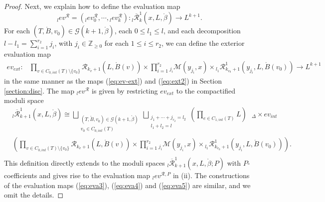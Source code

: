 \documentclass[a4paper]{article}
\numberwithin{equation}{section}
\begin{document}
\begin{proof}
Next, we explain how to define the evaluation map
\begin{equation}
{}_l\mathit{ev}^\mathcal{R}=({}_l\mathit{ev}^\mathcal{R}_0,\cdots,{}_l\mathit{ev}^\mathcal{R}_k):{}_l\overline{\mathcal{R}}_k^1(x,L,\ring{\beta})\rightarrow L^{k+1}.
\end{equation} 
For each $(T,\ring{B},v_0)\in\mathcal{G}(k+1,\ring{\beta})$, each $0\leq l_1\leq l$, and each decomposition $l-l_1=\sum_{i=1}^{r_2}j_i$, with $j_i\in\mathbb{Z}_{\geq0}$ for each $1\leq i\leq r_2$, we can define the exterior evaluation map
\begin{equation}
\begin{split}
\mathit{ev}_\mathit{ext}:&\prod_{v\in C_{0,\mathit{int}}(T)\setminus\{v_0\}}\mathcal{R}_{k_v+1}\left(L,\ring{B}(v)\right)\times\prod_{i=1}^{r_2}{}_{j_i}\mathcal{M}(y_{j_i},x)\times{}_{l_1}\mathcal{R}_{k_{v_0}+1}^1\left(y_{j_i},L,\ring{B}(v_0)\right)\rightarrow L^{k+1}
\end{split}
\end{equation}
in the same manner as the maps (\ref{eq:ev-ext}) and (\ref{eq:ext2}) in Section \ref{section:disc}. The map ${}_l\mathit{ev}^\mathcal{R}$ is given by restricting $\mathit{ev}_\mathit{ext}$ to the compactified moduli space
\begin{equation}
\begin{split}
&{}_l\overline{\mathcal{R}}_{k+1}^1(x,L,\ring{\beta})\cong\bigsqcup_{\substack{(T,\ring{B},v_0)\in\mathcal{G}(k+1,\ring{\beta})\\v_0\in C_{0,\mathit{int}}(T)}}\bigsqcup_{\substack{j_1+\cdots+j_{r_2}=l_2\\l_1+l_2=l}}\left(\prod_{e\in C_{1,\mathit{int}}(T)}L\right)\textrm{ }{{}_\Delta\times\mathit{ev}_\mathit{int}}\textrm{ } \\
&\left(\prod_{v\in C_{0,\mathit{int}}(T)\setminus\{v_0\}}\mathcal{R}_{k_v+1}\left(L,\ring{B}(v)\right)\times\prod_{i=1}^{r_2}{}_{j_i}\mathcal{M}(y_{j_i},x)\times{}_{l_1}\mathcal{R}_{k_{v_0}+1}^1\left(y_{j_i},L,\ring{B}(v_0)\right)\right). \\
\end{split}
\end{equation}
This definition directly extends to the moduli spaces ${}_l\overline{\mathcal{R}}_{k+1}^1(x,L,\ring{\beta};P)$ with $P$-coefficients and gives rise to the evaluation map ${}_l\mathit{ev}^{\mathcal{R},P}$ in (ii). The constructions of the evaluation maps (\ref{eq:eva3}), (\ref{eq:eva4}) and (\ref{eq:eva5}) are similar, and we omit the details.
	

\end{proof}
\end{document}
